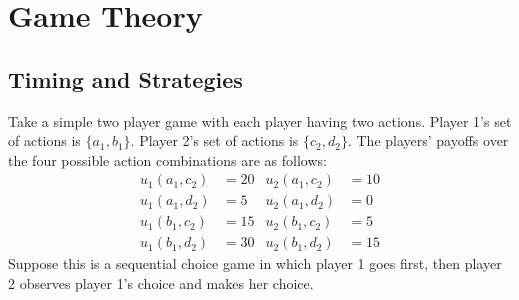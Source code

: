 \section{Game Theory}
\subsection{Timing and Strategies}

\noindent Take a simple two player game with each player having two actions. Player 1's set of actions is $\{a_1,b_1\}$. Player 2's set of actions is $\{c_2,d_2\}$. The players' payoffs over the four possible action combinations are as follows:
\begin{align*}
u_1(a_1,c_2) &= 20 & u_2(a_1,c_2) &= 10\\
u_1(a_1,d_2) &= 5 & u_2(a_1,d_2) &= 0\\
u_1(b_1,c_2) &= 15 & u_2(b_1,c_2) &= 5\\
u_1(b_1,d_2) &= 30 & u_2(b_1,d_2) &= 15
\end{align*}
Suppose this is a sequential choice game in which player 1 goes first, then player 2 observes player 1's choice and makes her choice.

